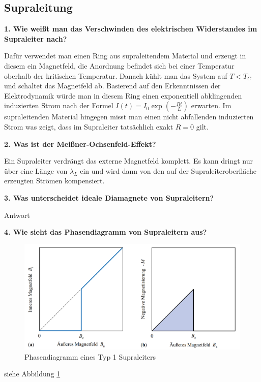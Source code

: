 \subsection{Supraleitung}
\noindent\textbf{1. Wie weißt man das Verschwinden des elektrischen Widerstandes im Supraleiter nach?}\\
\begin{addmargin}[25pt]{0pt}
Dafür verwendet man einen Ring aus supraleitendem Material und erzeugt in diesem ein Magnetfeld, die Anordnung befindet sich bei einer Temperatur oberhalb der kritischen Temperatur. Danach kühlt man das System auf $T<T_C$ und schaltet das Magnetfeld ab. Basierend auf den Erkenntnissen der Elektrodynamik würde man in diesem Ring einen exponentiell abklingenden induzierten Strom nach der Formel $I(t) = I_0 \exp\left(-\frac{Rt}{L}\right)$ erwarten. Im supraleitenden Material hingegen misst man einen nicht abfallenden induzierten Strom was zeigt, dass im Supraleiter tatsächlich exakt $R=0$ gilt. \\
\end{addmargin}

\noindent\textbf{2. Was ist der Meißner-Ochsenfeld-Effekt?}\\
\begin{addmargin}[25pt]{0pt}
Ein Supraleiter verdrängt das externe Magnetfeld komplett. Es kann dringt nur über eine Länge von $\lambda_L$ ein und wird dann von den auf der Supraleiteroberfläche erzeugten Strömen kompensiert.\\
\end{addmargin}

\noindent\textbf{3. Was unterscheidet ideale Diamagnete von Supraleitern?}\\
\begin{addmargin}[25pt]{0pt}
Antwort\\
\end{addmargin}

\noindent\textbf{4. Wie sieht das Phasendiagramm von Supraleitern aus?}\\
\begin{addmargin}[25pt]{0pt}
\begin{figure}
    \centering
    \includegraphics[width=0.7\linewidth]{images//KM2/SL_PhasendiagrammTyp1.PNG}
    \caption{Phasendiagramm eines Typ 1 Supraleiters}
    \label{fig:PhaseTyp1SL}
\end{figure}
siehe Abbildung \ref{fig:PhaseTyp1SL}
\end{addmargin}

